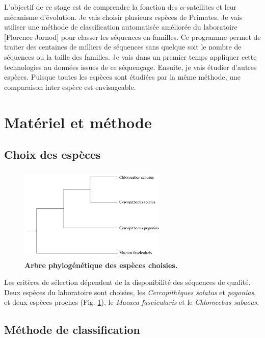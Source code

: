 \documentclass[12pt,a4paper]{article}
\begin{document}
L'objectif de ce stage est de comprendre la fonction des $\alpha$-satellites et leur mécanisme d'évolution. Je vais choisir plusieurs espèces de Primates. Je vais utiliser une méthode de classification automatisée améliorée du laboratoire [Florence Jornod] pour classer les séquences en familles.  Ce programme permet de traiter des centaines de milliers de séquences sans quelque soit le nombre de séquences ou la taille des familles. Je vais dans un premier temps appliquer cette technologies au données issues de ce séquençage. Ensuite, je vais étudier d'autres espèces. Puisque toutes les espèces sont étudiées par la  même méthode, une comparaison inter espèce est envisageable. 

\section{Matériel et méthode}
\subsection{Choix des espèces}
	\begin{figure}
		\center
		\includegraphics[height=4.5cm, width=7cm]{img/arbre_especes.png}
		\caption{\textbf{Arbre phylogénétique des espèces choisies.}
		\label{fig:arbre_presentation}}
	\end{figure}
Les critères de sélection dépendent de la disponibilité des séquences de qualité. Deux espèces du laboratoire sont choisies, les \textit{Cercopithèques solatus} et \textit{pogonias}, et deux espèces proches (Fig. \ref{fig:arbre_presentation}), le \textit{Macaca fascicularis} et le \textit{Chlorocebus sabaeus}.  

\subsection{Méthode de classification}
\end{document}

